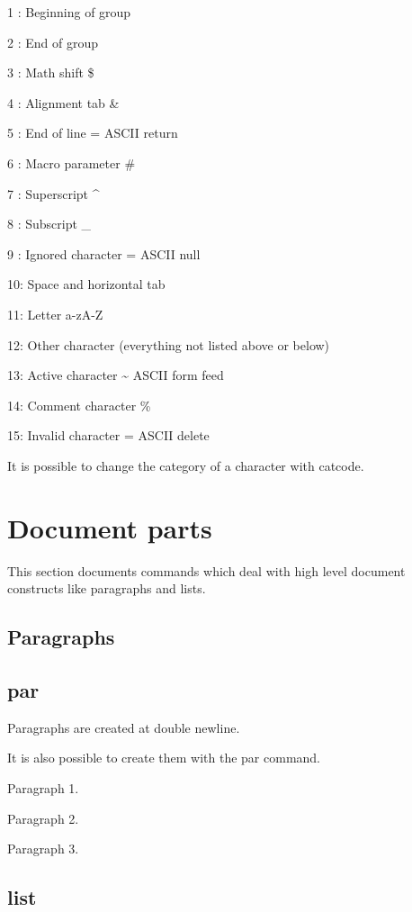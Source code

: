   1 : Beginning of group \bo

  2 : End of group \bc

  3 : Math shift \$

  4 : Alignment tab \&

  5 : End of line = ASCII return

  6 : Macro parameter \#

  7 : Superscript \^{}

  8 : Subscript \_

  9 : Ignored character = ASCII null

  10: Space and horizontal tab

  11: Letter a-zA-Z

  12: Other character (everything not listed above or below)

  13: Active character \~{} ASCII form feed

  14: Comment character \%

  15: Invalid character = ASCII delete

  It is possible to change the category of a character with \bs catcode.

\section{Document parts}

  This section documents commands which deal with high level document constructs like paragraphs and lists.

  \subsection{Paragraphs}

  \subsection{par}

    Paragraphs are created at double newline.

    It is also possible to create them with the \bs par command.

    Paragraph 1. \par
    Paragraph 2. \par
    Paragraph 3. \par

  \subsection{list}

